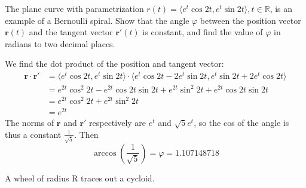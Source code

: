 \documentclass[12pt]{exam}
\begin{document}
\begin{questions}
\clearpage
\question The plane curve with parametrization $r(t) = \langle e^t \cos 2t, e^t \sin 2t\rangle, t \in \mathbb{R}$, is an example of a Bernoulli
spiral. Show that the angle $\varphi$ between the position vector $\mathbf{r}(t)$ and the tangent vector $\mathbf{r}'(t)$ is constant, and find the value of $\varphi$ in radians to two decimal places.
	\begin{solution}
		We find the dot product of the position and tangent vector:
		\begin{align*}
			\mathbf{r} \cdot \mathbf{r'} &= \langle e^t \cos 2t, e^t \sin 2t \rangle \cdot \langle e^t \cos 2t - 2e^t \sin 2t, e^t \sin 2t + 2e^t \cos 2t \rangle \\
			&= e^{2t} \cos^2 2t - e^{2t} \cos 2t \sin 2t + e^{2t} \sin^2 2t + e^{2t} \cos 2t \sin 2t \\
			& = e^{2t} \cos^2 2t + e^{2t} \sin^2 2t \\
			&= e^{2t}
		\end{align*}
		The norms of $\mathbf{r}$ and $\mathbf{r'}$ respectively are $e^t$ and $\sqrt{5}e^t$, so the cos of the angle is thus a constant $\frac{1}{\sqrt{5}}$. Then 
		\[ \arccos (\frac{1}{\sqrt{5}}) = \boxed{\varphi = 1.107148718} \tag*{\qed} \]
	\end{solution}
\clearpage
\question A wheel of radius R traces out a cycloid.
\end{questions}
\end{document}
